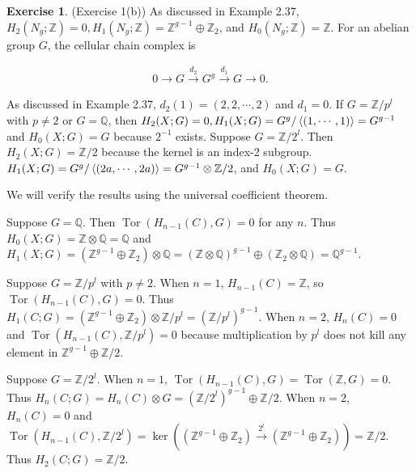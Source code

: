 \documentclass[12pt, psamsfonts]{amsart}
\theoremstyle{definition}
\newtheorem*{exer}{Exercise}
\theoremstyle{remark}
\DeclareMathOperator{\Tor}{Tor}
\numberwithin{equation}{section}
\begin{document}
\begin{exer}{(Exercise 1(b))}
  As discussed in Example 2.37, $H_2(N_g; \mathbb{Z}) = 0, H_1(N_g; \mathbb{Z}) = \mathbb{Z}^{g - 1} \oplus \mathbb{Z}_2$, and $H_0(N_g; \mathbb{Z}) = \mathbb{Z}$.
  For an abelian group $G$, the cellular chain complex is

  \begin{align*}
    0 \rightarrow G \xrightarrow{d_2} G^g \xrightarrow{d_1} G \rightarrow 0.
  \end{align*}

  As discussed in Example 2.37, $d_2(1) = (2, 2, \cdots, 2)$ and $d_1 = 0$.
  If $G = \mathbb{Z} / p^l$ with $p \ne 2$ or $G = \mathbb{Q}$, then $H_2(X; G) = 0, H_1(X; G) = G^g / \ev{(1, \cdots, 1)} = G^{g - 1}$ and $H_0(X; G) = G$ because $2^{-1}$ exists.
  Suppose $G = \mathbb{Z} / 2^l$.
  Then $H_2(X; G) = \mathbb{Z} / 2$ because the kernel is an index-2 subgroup.
  $H_1(X; G) = G^g / \ev{(2a, \cdots, 2a)} = G^{g - 1} \otimes \mathbb{Z} / 2$, and $H_0(X; G) = G$.

  We will verify the results using the universal coefficient theorem.

  Suppose $G = \mathbb{Q}$.
  Then $\Tor(H_{n - 1}(C), G) = 0$ for any $n$.
  Thus $H_0(X; G) = \mathbb{Z} \otimes \mathbb{Q} = \mathbb{Q}$ and $H_1(X; G) = (\mathbb{Z}^{g - 1} \oplus \mathbb{Z}_2) \otimes \mathbb{Q} = (\mathbb{Z} \otimes \mathbb{Q})^{g - 1} \oplus (\mathbb{Z}_2 \otimes \mathbb{Q}) = \mathbb{Q}^{g - 1}$.

  Suppose $G = \mathbb{Z} / p^l$ with $p \ne 2$.
  When $n = 1$, $H_{n - 1}(C) = \mathbb{Z}$, so $\Tor(H_{n - 1}(C), G) = 0$.
  Thus $H_1(C; G) = (\mathbb{Z}^{g - 1} \oplus \mathbb{Z}_2) \otimes \mathbb{Z} / p^l = (\mathbb{Z} / p^l)^{g - 1}$.
  When $n = 2$, $H_n(C) = 0$ and $\Tor(H_{n - 1}(C), \mathbb{Z} / p^l) = 0$ because multiplication by $p^l$ does not kill any element in $\mathbb{Z}^{g - 1} \oplus \mathbb{Z} / 2$.

  Suppose $G = \mathbb{Z} / 2^l$.
  When $n = 1$, $\Tor(H_{n - 1}(C), G) = \Tor(\mathbb{Z}, G) = 0$.
  Thus $H_n(C; G) = H_n(C) \otimes G = (\mathbb{Z} / 2^l)^{g - 1} \oplus \mathbb{Z} / 2$.
  When $n = 2$, $H_n(C) = 0$ and $\Tor(H_{n - 1}(C), \mathbb{Z} / 2^l) = \ker((\mathbb{Z}^{g - 1} \oplus \mathbb{Z}_2) \xrightarrow{2^l} (\mathbb{Z}^{g - 1} \oplus \mathbb{Z}_2)) = \mathbb{Z} / 2$.
  Thus $H_2(C; G) = \mathbb{Z} / 2$.
\end{exer}
\end{document}
